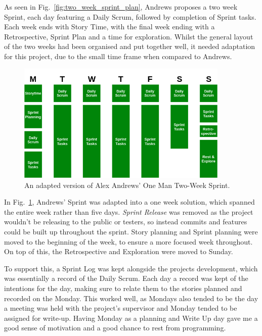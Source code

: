 \documentclass[a4paper,10pt]{report}
\begin{document}
As seen in Fig.~\ref{fig:two_week_sprint_plan}, Andrews proposes a two week Sprint, each day featuring a Daily Scrum, followed by completion of Sprint tasks. Each week ends with Story Time, with the final week ending with a Retrospective, Sprint Plan and a time for exploration. Whilst the general layout of the two weeks had been organised and put together well, it needed adaptation for this project, due to the small time frame when compared to Andrews. \medskip

\begin{figure}[h!]
    \centering
  \includegraphics[width=0.9\textwidth]{Images/Charts/Sprint_Plan.png}
 \caption{An adapted version of Alex Andrews' One Man Two-Week Sprint.}
 \label{fig:one_week_sprint_plan}
\end{figure}

In Fig.~\ref{fig:one_week_sprint_plan}, Andrews' Sprint was adapted into a one week solution, which spanned the entire week rather than five days. \textit{Sprint Release} was removed as the project wouldn't be releasing to the public or testers, so instead commits and features could be built up throughout the sprint. Story planning and Sprint planning were moved to the beginning of the week, to ensure a more focused week throughout. On top of this, the Retrospective and Exploration were moved to Sunday. \medskip

To support this, a Sprint Log was kept alongside the projects development, which was essentially a record of the Daily Scrum. Each day a record was kept of the intentions for the day, making sure to relate them to the stories planned and recorded on the Monday. This worked well, as Mondays also tended to be the day a meeting was held with the project's supervisor and Monday tended to be assigned for write-up. Having Monday as a planning and Write Up day gave me a good sense of motivation and a good chance to rest from programming. \medskip
\end{document}
